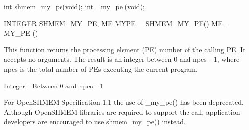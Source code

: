 
\synC
	  int shmem\_my\_pe(void);
	  int \_my\_pe (void);

\synF 
	  INTEGER SHMEM\_MY\_PE, ME
	  MYPE = SHMEM\_MY\_PE()
	  ME = MY\_PE ()



{
	This function returns the processing element (PE) number of the calling
  PE.   It accepts no arguments.	The result is an integer between 0 and
  npes - 1, where npes is the total number of PEs executing  the  current
  program.
}

{
		\desTB{ }
		{
				\cRow{}{}
		}

    {Integer - Between 0 and npes - 1}
}

{
	For OpenSHMEM Specification 1.1 the use of \_my\_pe() has been deprecated. Although OpenSHMEM libraries are required to support the call, application developers are encouraged to use shmem\_my\_pe() instead.
}

\eAPI
